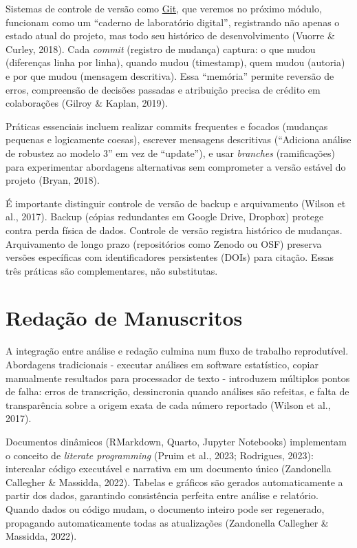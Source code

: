 \documentclass[
  a4paper,
]{book}
\begin{document}
Sistemas de controle de versão como \href{05-git.html}{Git}, que veremos
no próximo módulo, funcionam como um ``caderno de laboratório digital'',
registrando não apenas o estado atual do projeto, mas todo seu histórico
de desenvolvimento (Vuorre \& Curley, 2018). Cada \emph{commit}
(registro de mudança) captura: o que mudou (diferenças linha por linha),
quando mudou (timestamp), quem mudou (autoria) e por que mudou (mensagem
descritiva). Essa ``memória'' permite reversão de erros, compreensão de
decisões passadas e atribuição precisa de crédito em colaborações
(Gilroy \& Kaplan, 2019).

Práticas essenciais incluem realizar commits frequentes e focados
(mudanças pequenas e logicamente coesas), escrever mensagens descritivas
(``Adiciona análise de robustez ao modelo 3'' em vez de ``update''), e
usar \emph{branches} (ramificações) para experimentar abordagens
alternativas sem comprometer a versão estável do projeto (Bryan, 2018).

É importante distinguir controle de versão de backup e arquivamento
(Wilson et al., 2017). Backup (cópias redundantes em Google Drive,
Dropbox) protege contra perda física de dados. Controle de versão
registra histórico de mudanças. Arquivamento de longo prazo
(repositórios como Zenodo ou OSF) preserva versões específicas com
identificadores persistentes (DOIs) para citação. Essas três práticas
são complementares, não substitutas.

\section{Redação de Manuscritos}\label{redauxe7uxe3o-de-manuscritos}

A integração entre análise e redação culmina num fluxo de trabalho
reprodutível. Abordagens tradicionais - executar análises em software
estatístico, copiar manualmente resultados para processador de texto -
introduzem múltiplos pontos de falha: erros de transcrição, dessincronia
quando análises são refeitas, e falta de transparência sobre a origem
exata de cada número reportado (Wilson et al., 2017).

Documentos dinâmicos (RMarkdown, Quarto, Jupyter Notebooks) implementam
o conceito de \emph{literate programming} (Pruim et al., 2023;
Rodrigues, 2023): intercalar código executável e narrativa em um
documento único (Zandonella Callegher \& Massidda, 2022). Tabelas e
gráficos são gerados automaticamente a partir dos dados, garantindo
consistência perfeita entre análise e relatório. Quando dados ou código
mudam, o documento inteiro pode ser regenerado, propagando
automaticamente todas as atualizações (Zandonella Callegher \& Massidda,
2022).
\end{document}
